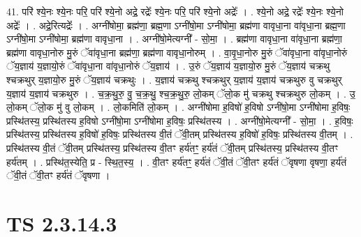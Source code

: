 \documentclass[17pt]{extarticle}
\begin{document}
41. परि॑ श्ये॒नः श्ये॒नः परि॒ परि॑ श्ये॒नो अद्रे॒ रद्रेः᳚ श्ये॒नः परि॒ परि॑ श्ये॒नो अद्रेः᳚ । . श्ये॒नो अद्रे॒ रद्रेः᳚ श्ये॒नः श्ये॒नो अद्रेः᳚ । . अद्रे॒रित्यद्रेः᳚ । . अग्नी॑षोमा॒ ब्रह्म॑णा॒ ब्रह्म॒णा ऽग्नी॑षो॒मा ऽग्नी॑षोमा॒ ब्रह्म॑णा वावृधा॒ना वा॑वृधा॒ना ब्रह्म॒णा ऽग्नी॑षो॒मा ऽग्नी॑षोमा॒ ब्रह्म॑णा वावृधा॒ना । . अग्नी॑षो॒मेत्यग्नी᳚ - सो॒मा॒ । . ब्रह्म॑णा वावृधा॒ना वा॑वृधा॒ना ब्रह्म॑णा॒ ब्रह्म॑णा वावृधा॒नोरु मु॒रुं ॅवा॑वृधा॒ना ब्रह्म॑णा॒ ब्रह्म॑णा वावृधा॒नोरुम् । . वा॒वृ॒धा॒नोरु मु॒रुं ॅवा॑वृधा॒ना वा॑वृधा॒नोरुं ॅय॒ज्ञाय॑ य॒ज्ञायो॒रुं ॅवा॑वृधा॒ना वा॑वृधा॒नोरुं ॅय॒ज्ञाय॑ । . उ॒रुं ॅय॒ज्ञाय॑ य॒ज्ञायो॒रु मु॒रुं ॅय॒ज्ञाय॑ चक्रथु श्चक्रथुर् य॒ज्ञायो॒रु मु॒रुं ॅय॒ज्ञाय॑ चक्रथुः । . य॒ज्ञाय॑ चक्रथु श्चक्रथुर् य॒ज्ञाय॑ य॒ज्ञाय॑ चक्रथुरु वु चक्रथुर् य॒ज्ञाय॑ य॒ज्ञाय॑ चक्रथुरु । . च॒क्र॒थु॒रु॒ वु॒ च॒क्र॒थु॒ श्च॒क्र॒थु॒रु॒ लो॒कम् ॅलो॒क मु॑ चक्रथु श्चक्रथुरु लो॒कम् । . उ॒ लो॒कम् ॅलो॒क मु॑ वु लो॒कम् । . लो॒कमिति॑ लो॒कम् । . अग्नी॑षोमा ह॒विषो॑ ह॒विषो ऽग्नी॑षो॒मा ऽग्नी॑षोमा ह॒विषः॒ प्रस्थि॑तस्य॒ प्रस्थि॑तस्य ह॒विषो ऽग्नी॑षो॒मा ऽग्नी॑षोमा ह॒विषः॒ प्रस्थि॑तस्य । . अग्नी॑षो॒मेत्यग्नी᳚ - सो॒मा॒ । . ह॒विषः॒ प्रस्थि॑तस्य॒ प्रस्थि॑तस्य ह॒विषो॑ ह॒विषः॒ प्रस्थि॑तस्य वी॒तं ॅवी॒तम् प्रस्थि॑तस्य ह॒विषो॑ ह॒विषः॒ प्रस्थि॑तस्य वी॒तम् । . प्रस्थि॑तस्य वी॒तं ॅवी॒तम् प्रस्थि॑तस्य॒ प्रस्थि॑तस्य वी॒तꣳ हर्य॑तꣳ॒॒ हर्य॑तं ॅवी॒तम् प्रस्थि॑तस्य॒ प्रस्थि॑तस्य वी॒तꣳ हर्य॑तम् । . प्रस्थि॑त॒स्येति॒ प्र - स्थि॒त॒स्य॒ । . वी॒तꣳ हर्य॑तꣳ॒॒ हर्य॑तं ॅवी॒तं ॅवी॒तꣳ हर्य॑तं ॅवृषणा वृषणा॒ हर्य॑तं ॅवी॒तं ॅवी॒तꣳ हर्य॑तं ॅवृषणा । \newline
\pagebreak
{}

\section{ TS 2.3.14.3 }
\end{document}

